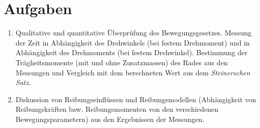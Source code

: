 \documentclass[a4paper,german,12pt,smallheadings]{scrartcl}
\begin{document}
\section*{Aufgaben}
\begin{enumerate}[1.]
  \item Qualitative und quantitative Überprüfung des Bewegungsgesetzes. Messung
    der Zeit in Abhängigkeit des Drehwinkels (bei festem Drehmoment) und in
    Abhängigkeit des Drehmoments (bei festem Drehwinkel). Bestimmung der
    Trägheitsmomente (mit und ohne Zusatzmassen) des Rades aus den Messungen
    und Vergleich mit dem berechneten Wert aus dem \textit{Steinerschen Satz}.
  \item
    Diskussion von Reibungseinflüssen und Reibungsmodellen (Abhängigkeit von
    Reibungskräften bzw. Reibungsmomenten von den verschiedenen
    Bewegungsparametern) aus den Ergebnissen der Messungen.
\end{enumerate}
\end{document}
